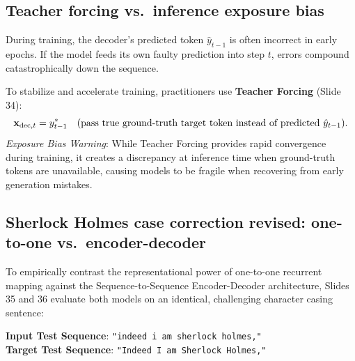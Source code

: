 \documentclass[../../main.tex]{subfiles}
\begin{document}
\subsection{Teacher forcing vs.~inference exposure bias}
During training, the decoder's predicted token $\hat{y}_{t-1}$ is often incorrect in early epochs. If the model feeds its own faulty prediction into step $t$, errors compound catastrophically down the sequence.

To stabilize and accelerate training, practitioners use \textbf{Teacher Forcing} (Slide 34):
\begin{equation}
\label{eq:teacher_forcing}
\mathbf{x}_{\text{dec}, t} = y_{t-1}^* \quad (\text{pass true ground-truth target token instead of predicted } \hat{y}_{t-1}).
\end{equation}
\emph{Exposure Bias Warning}: While Teacher Forcing provides rapid convergence during training, it creates a discrepancy at inference time when ground-truth tokens are unavailable, causing models to be fragile when recovering from early generation mistakes.

\subsection{Sherlock Holmes case correction revised: one-to-one vs.~encoder-decoder}
\label{subsec:sherlock_seq2seq_comparison}

To empirically contrast the representational power of one-to-one recurrent mapping against the Sequence-to-Sequence Encoder-Decoder architecture, Slides 35 and 36 evaluate both models on an identical, challenging character casing sentence:
\begin{center}
\textbf{Input Test Sequence}: \texttt{"indeed i am sherlock holmes,"} \\
\textbf{Target Test Sequence}: \texttt{"Indeed I am Sherlock Holmes,"}
\end{center}
\end{document}
